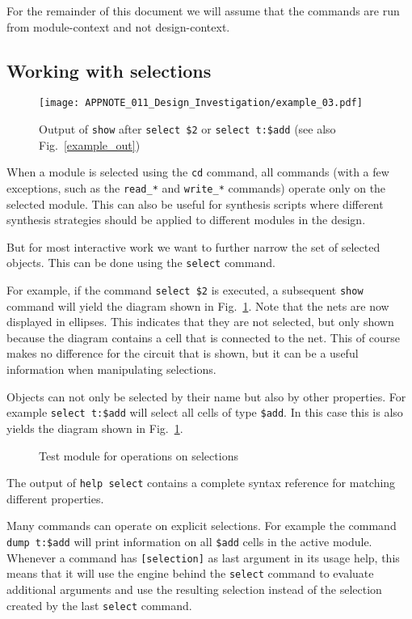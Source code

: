 \documentclass[9pt,technote,a4paper]{IEEEtran}
\begin{document}
For the remainder of this document we will assume that the commands are run from
module-context and not design-context.

\subsection{Working with selections}

\begin{figure}[t]
\texttt{[image: APPNOTE\_011\_Design\_Investigation/example\_03.pdf]}
\caption{Output of {\tt show} after {\tt select \$2} or {\tt select t:\$add}
(see also Fig.~\ref{example_out})}
\label{seladd}
\end{figure}

When a module is selected using the {\tt cd} command, all commands (with a few
exceptions, such as the {\tt read\_*} and {\tt write\_*} commands) operate
only on the selected module. This can also be useful for synthesis scripts
where different synthesis strategies should be applied to different modules
in the design.

But for most interactive work we want to further narrow the set of selected
objects. This can be done using the {\tt select} command.

For example, if the command {\tt select \$2} is executed, a subsequent {\tt show}
command will yield the diagram shown in Fig.~\ref{seladd}. Note that the nets are
now displayed in ellipses. This indicates that they are not selected, but only
shown because the diagram contains a cell that is connected to the net. This
of course makes no difference for the circuit that is shown, but it can be a useful
information when manipulating selections.

Objects can not only be selected by their name but also by other properties.
For example {\tt select t:\$add} will select all cells of type {\tt \$add}. In
this case this is also yields the diagram shown in Fig.~\ref{seladd}.

\begin{figure}[b]

\caption{Test module for operations on selections}
\label{foobaraddsub}
\end{figure}

The output of {\tt help select} contains a complete syntax reference for
matching different properties.

Many commands can operate on explicit selections. For example the command {\tt
dump t:\$add} will print information on all {\tt \$add} cells in the active
module. Whenever a command has {\tt [selection]} as last argument in its usage
help, this means that it will use the engine behind the {\tt select} command
to evaluate additional arguments and use the resulting selection instead of
the selection created by the last {\tt select} command.
\end{document}
